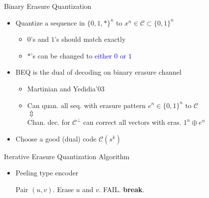 \documentclass{beamer}
\newlength{\twocolwid}
\newlength{\itemspace}
\newlength{\subitemspace}
\begin{document}
\begin{frame}
\begin{columns}[t]
\begin{column}{\twocolwid}
    \vspace{2cm}
 \begin{block}{Binary Erasure Quantization}
  \begin{itemize}
  \item Quantize a sequence in $\{0,1,*\}^n$ to $x^n \in \mathcal{C} \subset \{0,1\}^n$
    \begin{itemize}
    \item \vspace{\subitemspace}$0$'s and $1$'s should \alert{match exactly}
    \item \vspace{\subitemspace}$*$'s can be changed to \textcolor{blue}{either $0$ or $1$}
    \end{itemize}
    \vspace{0.25cm}
  \item BEQ is the dual of decoding on binary erasure channel
    \begin{itemize}
    \item\vspace{\subitemspace} Martinian and Yedidia'03
    \item\vspace{\subitemspace} Can quan. all seq. with erasure pattern $e^n \in \{0,1\}^n$ to $\mathcal{C}$ \\ \hspace{3.5cm} $\Updownarrow$ \\ Chan. dec. for $\mathcal{C}^{\perp}$ can correct all vectors with eras. $1^n \oplus e^n$
    \end{itemize}
  \item\vspace{\itemspace} Choose a good (dual) code $\mathcal{C}(s^k)$
  \end{itemize}
 \end{block}


\vspace{2cm}
\begin{block}{Iterative Erasure Quantization Algorithm}
  \begin{center}
    \scalebox{1}{}
  \end{center}
  \begin{itemize}
  \item \alert{Peeling type encoder}
  \begin{center}
    \begin{algorithmic}
      \STATE Pair $(u,v)$.
      \STATE Erase $u$ and $v$.
      \ELSE
      \STATE FAIL.
      \STATE \textbf{break}.
      \ENDIF
      \ENDWHILE
    \end{algorithmic}
  \end{center}
\end{itemize}  
\end{block}
\end{column}
 

\end{columns}
\end{frame}
\end{document}
